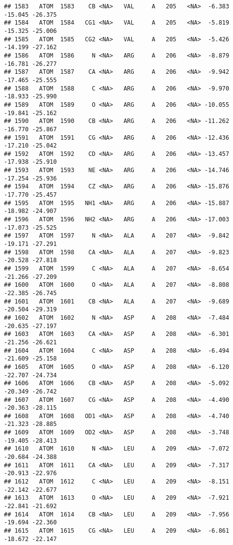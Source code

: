 \documentclass[
]{article}
\begin{document}
\begin{verbatim}
## 1583   ATOM  1583    CB <NA>   VAL     A   205   <NA>  -6.383 -15.045 -26.375
## 1584   ATOM  1584   CG1 <NA>   VAL     A   205   <NA>  -5.819 -15.325 -25.006
## 1585   ATOM  1585   CG2 <NA>   VAL     A   205   <NA>  -5.426 -14.199 -27.162
## 1586   ATOM  1586     N <NA>   ARG     A   206   <NA>  -8.879 -16.781 -26.277
## 1587   ATOM  1587    CA <NA>   ARG     A   206   <NA>  -9.942 -17.465 -25.555
## 1588   ATOM  1588     C <NA>   ARG     A   206   <NA>  -9.970 -18.933 -25.990
## 1589   ATOM  1589     O <NA>   ARG     A   206   <NA> -10.055 -19.841 -25.162
## 1590   ATOM  1590    CB <NA>   ARG     A   206   <NA> -11.262 -16.770 -25.867
## 1591   ATOM  1591    CG <NA>   ARG     A   206   <NA> -12.436 -17.210 -25.042
## 1592   ATOM  1592    CD <NA>   ARG     A   206   <NA> -13.457 -17.938 -25.910
## 1593   ATOM  1593    NE <NA>   ARG     A   206   <NA> -14.746 -17.254 -25.936
## 1594   ATOM  1594    CZ <NA>   ARG     A   206   <NA> -15.876 -17.770 -25.457
## 1595   ATOM  1595   NH1 <NA>   ARG     A   206   <NA> -15.887 -18.982 -24.907
## 1596   ATOM  1596   NH2 <NA>   ARG     A   206   <NA> -17.003 -17.073 -25.525
## 1597   ATOM  1597     N <NA>   ALA     A   207   <NA>  -9.842 -19.171 -27.291
## 1598   ATOM  1598    CA <NA>   ALA     A   207   <NA>  -9.823 -20.528 -27.818
## 1599   ATOM  1599     C <NA>   ALA     A   207   <NA>  -8.654 -21.266 -27.209
## 1600   ATOM  1600     O <NA>   ALA     A   207   <NA>  -8.808 -22.385 -26.745
## 1601   ATOM  1601    CB <NA>   ALA     A   207   <NA>  -9.689 -20.504 -29.319
## 1602   ATOM  1602     N <NA>   ASP     A   208   <NA>  -7.484 -20.635 -27.197
## 1603   ATOM  1603    CA <NA>   ASP     A   208   <NA>  -6.301 -21.256 -26.621
## 1604   ATOM  1604     C <NA>   ASP     A   208   <NA>  -6.494 -21.609 -25.158
## 1605   ATOM  1605     O <NA>   ASP     A   208   <NA>  -6.120 -22.707 -24.734
## 1606   ATOM  1606    CB <NA>   ASP     A   208   <NA>  -5.092 -20.349 -26.742
## 1607   ATOM  1607    CG <NA>   ASP     A   208   <NA>  -4.490 -20.363 -28.115
## 1608   ATOM  1608   OD1 <NA>   ASP     A   208   <NA>  -4.740 -21.323 -28.885
## 1609   ATOM  1609   OD2 <NA>   ASP     A   208   <NA>  -3.748 -19.405 -28.413
## 1610   ATOM  1610     N <NA>   LEU     A   209   <NA>  -7.072 -20.684 -24.388
## 1611   ATOM  1611    CA <NA>   LEU     A   209   <NA>  -7.317 -20.913 -22.976
## 1612   ATOM  1612     C <NA>   LEU     A   209   <NA>  -8.151 -22.142 -22.677
## 1613   ATOM  1613     O <NA>   LEU     A   209   <NA>  -7.921 -22.841 -21.692
## 1614   ATOM  1614    CB <NA>   LEU     A   209   <NA>  -7.956 -19.694 -22.360
## 1615   ATOM  1615    CG <NA>   LEU     A   209   <NA>  -6.861 -18.672 -22.147

\end{verbatim}
\end{document}
